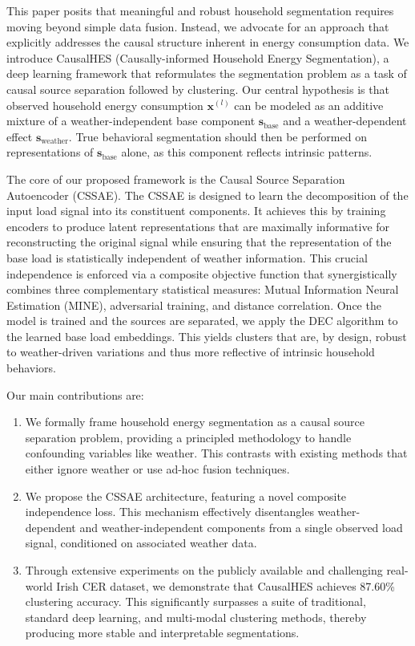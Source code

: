 \documentclass[journal]{IEEEtran}
\begin{document}
This paper posits that meaningful and robust household segmentation requires moving beyond simple data fusion. Instead, we advocate for an approach that explicitly addresses the causal structure inherent in energy consumption data. We introduce CausalHES (Causally-informed Household Energy Segmentation), a deep learning framework that reformulates the segmentation problem as a task of causal source separation followed by clustering. Our central hypothesis is that observed household energy consumption $\mathbf{x}^{(l)}$ can be modeled as an additive mixture of a weather-independent base component $\mathbf{s}_{\text{base}}$ and a weather-dependent effect $\mathbf{s}_{\text{weather}}$. True behavioral segmentation should then be performed on representations of $\mathbf{s}_{\text{base}}$ alone, as this component reflects intrinsic patterns.

The core of our proposed framework is the Causal Source Separation Autoencoder (CSSAE). The CSSAE is designed to learn the decomposition of the input load signal into its constituent components. It achieves this by training encoders to produce latent representations that are maximally informative for reconstructing the original signal while ensuring that the representation of the base load is statistically independent of weather information. This crucial independence is enforced via a composite objective function that synergistically combines three complementary statistical measures: Mutual Information Neural Estimation (MINE), adversarial training, and distance correlation. Once the model is trained and the sources are separated, we apply the DEC algorithm to the learned base load embeddings. This yields clusters that are, by design, robust to weather-driven variations and thus more reflective of intrinsic household behaviors.

Our main contributions are:
\begin{enumerate}
    \item We formally frame household energy segmentation as a causal source separation problem, providing a principled methodology to handle confounding variables like weather. This contrasts with existing methods that either ignore weather or use ad-hoc fusion techniques.
    \item We propose the CSSAE architecture, featuring a novel composite independence loss. This mechanism effectively disentangles weather-dependent and weather-independent components from a single observed load signal, conditioned on associated weather data.
    \item Through extensive experiments on the publicly available and challenging real-world Irish CER dataset, we demonstrate that CausalHES achieves 87.60\% clustering accuracy. This significantly surpasses a suite of traditional, standard deep learning, and multi-modal clustering methods, thereby producing more stable and interpretable segmentations.
\end{enumerate}
\end{document}
